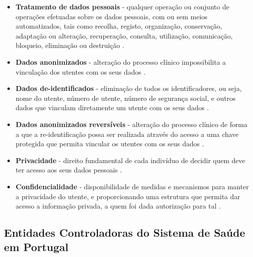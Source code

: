 \documentclass[conference]{IEEEtran}
\begin{document}
\begin{itemize}
	\item \textbf{Tratamento de dados pessoais} - qualquer operação ou conjunto de operações efetuadas sobre os dados pessoais, com ou sem meios automatizados, tais como recolha, registo, organização, conservação, adaptação ou alteração, recuperação, consulta, utilização, comunicação, bloqueio, eliminação ou destruição \cite{parecerERS2015}.
	
	\item \textbf{Dados anonimizados} - alteração do processo clínico impossibilita a vinculação dos utentes com os seus dados \cite{safran2007toward}.
	
	\item \textbf{Dados de-identificados} - eliminação de todos os identificadores, ou seja, nome do utente, número de utente, número de segurança social, e outros dados que vinculam diretamente um utente com os seus dados \cite{safran2007toward}.
	
	\item \textbf{Dados anonimizados reversíveis} - alteração do processo clínico de forma a que a re-identificação possa ser realizada através do acesso a uma chave protegida que permita vincular os utentes com os seus dados \cite{safran2007toward}.
	
	\item \textbf{Privacidade} - direito fundamental de cada indivíduo de decidir quem deve ter acesso aos seus dados pessoais \cite{segurancaSI}.
	
	\item \textbf{Confidencialidade} - disponibilidade de medidas e mecanismos para manter a privacidade do utente, e proporcionando uma estrutura que permita dar acesso a informação privada, a quem foi dada autorização para tal \cite{segurancaSI}.
	
\end{itemize}


\subsection{Entidades Controladoras do Sistema de Saúde em Portugal}
\end{document}
